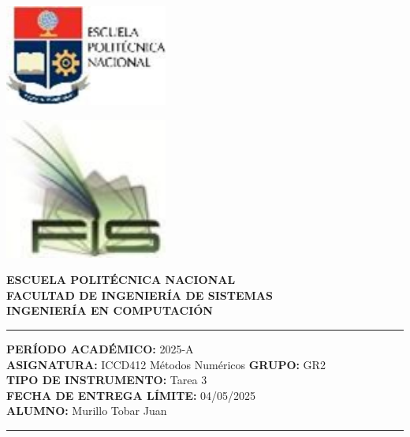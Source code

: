\documentclass[12pt]{article}
\begin{document}
\begin{minipage}{0.45\textwidth}
    \includegraphics[width=0.4\textwidth]{inFiles/Figures/epnLogo.jpg}
\end{minipage}
\hfill
\begin{minipage}{0.45\textwidth}
    \raggedleft
    \includegraphics[width=0.4\textwidth]{inFiles/Figures/FIS_logo.jpg}
\end{minipage}

\vspace{0.5cm}

\begin{center}
    \textbf{ESCUELA POLITÉCNICA NACIONAL}\\[0.2cm]
    \textbf{FACULTAD DE INGENIERÍA DE SISTEMAS}\\[0.2cm]
    \textbf{INGENIERÍA{\textbf{ EN COMPUTACIÓN}}}
\end{center}

\vspace{0.5cm}
\hrule
\vspace{0.5cm}

\noindent\textbf{PERÍODO ACADÉMICO:} 2025-A\\[0.2cm]
\noindent\textbf{ASIGNATURA:} ICCD412 Métodos Numéricos \hfill \textbf{GRUPO:} GR2\\[0.2cm]
\noindent\textbf{TIPO DE INSTRUMENTO:} Tarea 3\\[0.2cm]
\noindent\textbf{FECHA DE ENTREGA LÍMITE:} 04/05/2025\\[0.2cm]
\noindent\textbf{ALUMNO:} Murillo Tobar Juan 

\vspace{0.5cm}
\hrule
\vspace{1cm}
\end{document}
